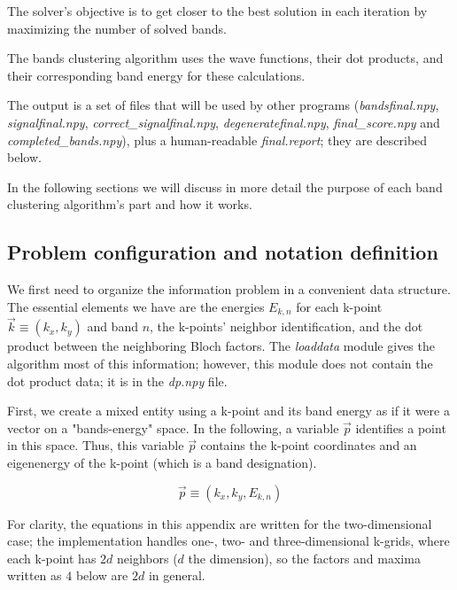 \documentclass[a4paper,12pt]{report}
\begin{document}
\begin{appendices}
The solver's objective is to get closer to the best solution in each iteration by maximizing the number of solved bands.

The bands clustering algorithm uses the wave functions, their dot products, and their corresponding band energy for these calculations.

\begin{sloppypar}
The output is a set of files that will be used by other programs (\textit{bandsfinal.npy}, \textit{signalfinal.npy}, \textit{correct\_signalfinal.npy}, \textit{degeneratefinal.npy}, \textit{final\_score.npy} and \textit{completed\_bands.npy}), plus a human-readable \textit{final.report}; they are described below.
\end{sloppypar}

In the following sections we will discuss in more detail the purpose of each band clustering algorithm's part and how it works.



\subsection{Problem configuration and notation definition}

We first need to organize the information problem in a convenient data structure.
The essential elements we have are the energies $E_{k,n}$ for each k-point $\vec{k}\equiv \left(k_x, k_y\right)$ and band $n$, the k-points' neighbor identification, and the dot product between the neighboring Bloch factors.
The \textit{loaddata} module gives the algorithm most of this information; however, this module does not contain the dot product data; it is in the \textit{dp.npy} file.

First, we create a mixed entity using a k-point and its band energy as if it were a vector on a "bands-energy" space.
In the following, a variable $\vec{p}$ identifies a point in this space.
Thus, this variable $\vec{p}$ contains the k-point coordinates and an eigenenergy of the k-point (which is a band designation).

\begin{equation}
    \vec{p} \equiv \left(k_x, k_y, E_{k,n}\right)
\end{equation}

For clarity, the equations in this appendix are written for the two-dimensional case; the
implementation handles one-, two- and three-dimensional k-grids, where each k-point has $2d$
neighbors ($d$ the dimension), so the factors and maxima written as $4$ below are $2d$ in general.


\end{appendices}
\end{document}
